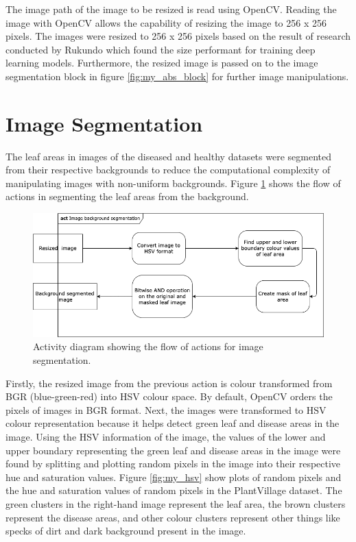 The image path of the image to be resized is read using OpenCV. Reading the image with OpenCV allows the capability of resizing the image to 256 x 256 pixels. The images were resized to 256 x 256 pixels based on the result of research conducted by Rukundo \cite{rukundo2021effects} which found the size performant for training deep learning models. Furthermore, the resized image is passed on to the image segmentation block in figure \ref{fig:my_abs_block} for further image manipulations.

\section{Image Segmentation}
The leaf areas in images of the diseased and healthy datasets were segmented from their respective backgrounds to reduce the computational complexity of manipulating images with non-uniform backgrounds. Figure \ref{fig:my_act2} shows the flow of actions in segmenting the leaf areas from the background.
\begin{figure}[!htb]
    \centering
    \includegraphics[scale=0.55, keepaspectratio]{Figures/act2.png}
    \caption{Activity diagram showing the flow of actions for image segmentation.}
    \label{fig:my_act2}
\end{figure}

Firstly, the resized image from the previous action is colour transformed from BGR (blue-green-red) into HSV colour space. By default, OpenCV orders the pixels of images in BGR format. Next, the images were transformed to HSV colour representation because it helps detect green leaf and disease areas in the image. Using the HSV information of the image, the values of the lower and upper boundary representing the green leaf and disease areas in the image were found by splitting and plotting random pixels in the image into their respective hue and saturation values. Figure \ref{fig:my_hsv} show plots of random pixels and the hue and saturation values of random pixels in the PlantVillage dataset. The green clusters in the right-hand image represent the leaf area, the brown clusters represent the disease areas, and other colour clusters represent other things like specks of dirt and dark background present in the image.

